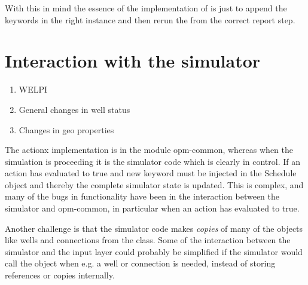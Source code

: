 With this in mind the essence of the implementation of \actionx{} is just to
append the \actionx{} keywords in the right  instance
and then rerun the  from the
correct report step.

\section{Interaction with the simulator}

\begin{enumerate}
\item WELPI
\item General changes in well status
\item Changes in geo properties
\end{enumerate}

The actionx implementation is in the module opm-common, whereas when the
simulation is proceeding it is the simulator code which is clearly in control.
If an action has evaluated to true and new keyword must be injected in the
Schedule object and thereby the complete simulator state is updated. This is
complex, and many of the bugs in \actionx{} functionality have been in the
interaction between the simulator and opm-common, in particular when an action
has evaluated to true.

Another challenge is that the simulator code makes \emph{copies} of many of the
objects like wells and connections from the  class. Some of
the interaction between the simulator and the input layer could probably be
simplified if the simulator would call the  object when
e.g. a well or connection is needed, instead of storing references or copies
internally.

